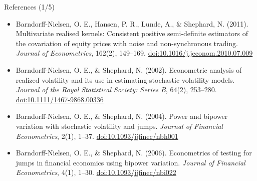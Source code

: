 \begin{frame}{References (1/5)}
\begin{itemize}
    \item Barndorff-Nielsen, O. E., Hansen, P. R., Lunde, A., \& Shephard, N. (2011). Multivariate realised kernels: Consistent positive semi-definite estimators of the covariation of equity prices with noise and non-synchronous trading. \textit{Journal of Econometrics}, 162(2), 149--169. \href{https://doi.org/10.1016/j.jeconom.2010.07.009}{doi:10.1016/j.jeconom.2010.07.009}
    \item Barndorff-Nielsen, O. E., \& Shephard, N. (2002). Econometric analysis of realized volatility and its use in estimating stochastic volatility models. \textit{Journal of the Royal Statistical Society: Series B}, 64(2), 253--280. \href{https://doi.org/10.1111/1467-9868.00336}{doi:10.1111/1467-9868.00336}
    \item Barndorff-Nielsen, O. E., \& Shephard, N. (2004). Power and bipower variation with stochastic volatility and jumps. \textit{Journal of Financial Econometrics}, 2(1), 1--37. \href{https://doi.org/10.1093/jjfinec/nbh001}{doi:10.1093/jjfinec/nbh001}
    \item Barndorff-Nielsen, O. E., \& Shephard, N. (2006). Econometrics of testing for jumps in financial economics using bipower variation. \textit{Journal of Financial Econometrics}, 4(1), 1--30. \href{https://doi.org/10.1093/jjfinec/nbi022}{doi:10.1093/jjfinec/nbi022}
\end{itemize}
\end{frame}

